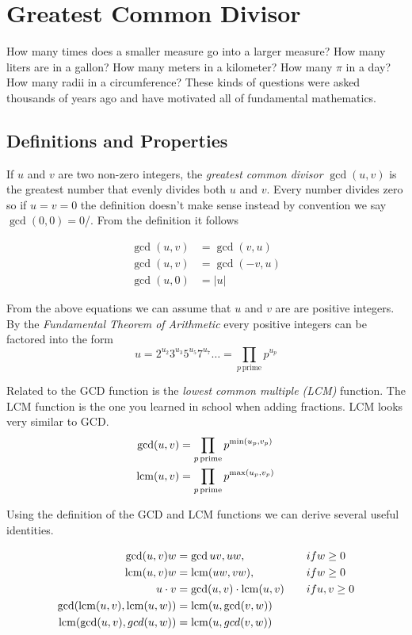 \chapter{Greatest Common Divisor}
How many times does a smaller measure go into a larger measure?
How many liters are in a gallon? How many meters in a kilometer?
How many $\pi$ in a day? How many radii in a circumference? These kinds of
questions were asked thousands of years ago and have motivated all of fundamental
mathematics.

\section{Definitions and Properties}
If $u$ and $v$ are two non-zero integers, the \textit{greatest common divisor} $\gcd(u, v)$ is the
greatest number that evenly divides both $u$ and $v$. Every number divides zero so if $u = v = 0$ 
the definition doesn't make sense instead by convention we say $\gcd(0, 0) = 0$/. From the definition
it follows

\begin{align}
	\gcd(u, v) &= \gcd(v, u) \\
	\gcd(u, v) &= \gcd(-v, u) \\
	\gcd(u, 0) &= \left| u \right|
\end{align}

From the above equations we can assume that $u$ and $v$ are are positive integers. By the
\textit{Fundamental Theorem of Arithmetic} every positive integers can be factored into the form
\begin{equation}
	u = 2^{u_{2}} 3^{u_{3}} 5^{u_{5}} 7^{u_{7}}\ldots = \prod_{p \, \text{prime}}{p^{u_{p}}}
\end{equation}

Related to the GCD function is the \textit{lowest common multiple (LCM)} function. The LCM function is
the one you learned in school when adding fractions. LCM looks very similar to GCD.
\begin{align}
	\gcd(u, v) &= \prod_{p \, \text{prime}}{p^{\min(u_{p},v_{p})}} \\
	\operatorname{lcm}(u, v) &= \prod_{p \, \text{prime}}{p^{\max(u_{p},v_{p})}}
\end{align}

Using the definition of the GCD and LCM functions we can derive several useful identities.

\begin{align}
	\gcd(u, v)w &= \gcd{uv, uw}, \quad &&if w \geq 0 \\
	\operatorname{lcm}(u, v)w &= \operatorname{lcm}(uw, vw), \quad &&if w \geq 0 \\
	u \cdot v   &= \gcd(u, v) \cdot \operatorname{lcm}(u, v) \quad &&if u, v \geq 0 \\
	\gcd(\operatorname{lcm}(u, v), \operatorname{lcm}(u, w)) &= \operatorname{lcm}(u, \gcd(v, w)) \\
	\operatorname{lcm}(\gcd(u, v), gcd(u, w)) &= \operatorname{lcm}(u, gcd(v, w))
\end{align}


